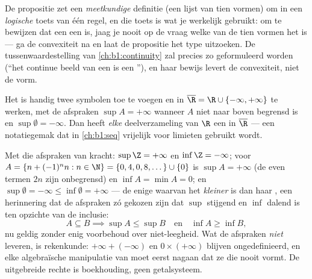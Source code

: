 \begin{remark}
De propositie zet een \emph{meetkundige} definitie (een lijst van tien
vormen) om in een \emph{logische} toets van één regel, en die toets is
wat je werkelijk gebruikt: om te bewijzen dat een  een
 is, jaag je nooit op de vraag welke van de tien vormen het is
--- ga de convexiteit na en laat de propositie het type uitzoeken. De
tussenwaardestelling van \cref{ch:b1:continuity} zal precies zo
geformuleerd worden (``het continue beeld van een  is een
''), en haar bewijs levert de convexiteit, niet de vorm.
\end{remark}

\begin{remark}
Het is handig twee symbolen toe te voegen en in $\overline\R = \R \cup
\{-\infty, +\infty\}$ te werken, met de afspraken $\sup A = +\infty$
wanneer $A$ niet naar boven begrensd is en $\sup \emptyset = -\infty$.
Dan heeft \emph{elke} deelverzameling van $\R$ een  in
$\overline\R$ --- een notatiegemak dat in \cref{ch:b1:seq} vrijelijk voor
limieten gebruikt wordt.
\end{remark}

\begin{example}\label{ex:b1:reals:extendedcompute}
Met die afspraken van kracht: $\sup \Z = +\infty$ en $\inf \Z =
-\infty$; voor $A = \{n + (-1)^n n : n \in \N\} = \{0, 4, 0, 8, \dots\}
\cup \{0\}$ is $\sup A = +\infty$ (de even termen $2n$ zijn onbegrensd)
en $\inf A = \min A = 0$; en $\sup\emptyset = -\infty \leq \inf\emptyset
= +\infty$ --- de enige  waarvan het  \emph{kleiner}
is dan haar , een herinnering dat de afspraken zó gekozen zijn dat
$\sup$ stijgend en $\inf$ dalend is ten opzichte van de inclusie:
\[
A \subseteq B \implies \sup A \leq \sup B
\quad\text{en}\quad \inf A \geq \inf B ,
\]
nu geldig zonder enig voorbehoud over niet-leegheid. Wat de afspraken
\emph{niet} leveren, is rekenkunde: $+\infty + (-\infty)$ en $0 \times
(+\infty)$ blijven ongedefinieerd, en elke algebraïsche manipulatie van
 moet eerst nagaan dat ze die nooit vormt. De uitgebreide rechte
is boekhouding, geen getalsysteem.
\end{example}

